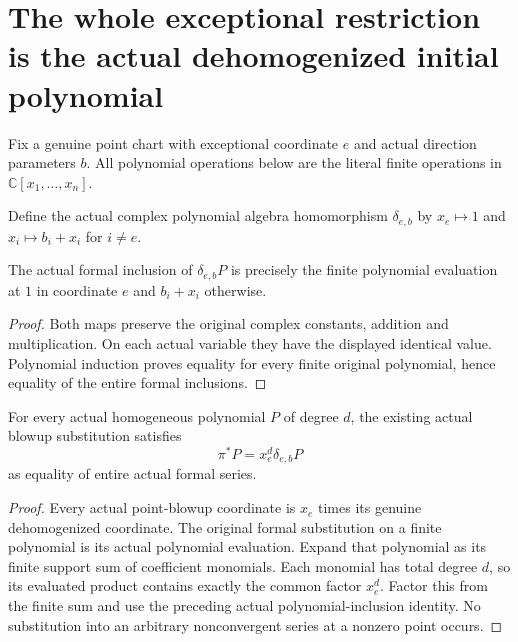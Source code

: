 \section{The whole exceptional restriction is the actual dehomogenized initial polynomial}

Fix a genuine point chart with exceptional coordinate $e$ and actual
direction parameters $b$. All polynomial operations below are the literal
finite operations in $\mathbb C[x_1,\ldots,x_n]$.

\begin{definition}
\label{hir:actual-point-polynomial-dehomogenization}
\leanok
Define the actual complex polynomial algebra homomorphism
$\delta_{e,b}$ by $x_e\mapsto1$ and $x_i\mapsto b_i+x_i$ for $i\ne e$.
\end{definition}

\begin{lemma}
\label{hir:actual-point-polynomial-dehomogenization-inclusion}
\leanok
The actual formal inclusion of $\delta_{e,b}P$ is precisely the finite
polynomial evaluation at $1$ in coordinate $e$ and $b_i+x_i$ otherwise.
\end{lemma}
\begin{proof}
Both maps preserve the original complex constants, addition and
multiplication. On each actual variable they have the displayed identical
value. Polynomial induction proves equality for every finite original
polynomial, hence equality of the entire formal inclusions.
\end{proof}

\begin{theorem}
\label{hir:actual-point-blowup-homogeneous-polynomial-factor}
\leanok
For every actual homogeneous polynomial $P$ of degree $d$, the existing
actual blowup substitution satisfies
\[
 \pi^*P=x_e^d\delta_{e,b}P
\]
as equality of entire actual formal series.
\end{theorem}
\begin{proof}
Every actual point-blowup coordinate is $x_e$ times its genuine
dehomogenized coordinate. The original formal substitution on a finite
polynomial is its actual polynomial evaluation. Expand that polynomial
as its finite support sum of coefficient monomials. Each monomial has
total degree $d$, so its evaluated product contains exactly the common
factor $x_e^d$. Factor this from the finite sum and use the preceding
actual polynomial-inclusion identity. No substitution into an arbitrary
nonconvergent series at a nonzero point occurs.
\end{proof}

